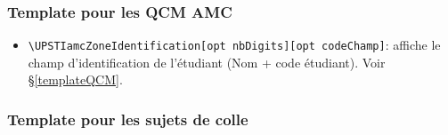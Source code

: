 \documentclass[11pt]{article}
\begin{document}
\subsubsection{Template pour les QCM AMC}
\begin{figure}[!ht]
    \centering
\end{figure}

\begin{figure}[!ht]
    \centering
\end{figure}

\begin{itemize}
\item \color{UPSTIcustomColor1}\verb!\UPSTIamcZoneIdentification[opt nbDigits][opt codeChamp]!\color{black}: affiche le champ d'identification de l'étudiant (Nom + code étudiant). Voir \S \ref{templateQCM}.
\end{itemize}

\subsubsection{Template pour les sujets de colle\label{templateKhollebasic}}
\begin{figure}[!ht]
    \centering
\end{figure}

\begin{figure}[!ht]
    \centering
\end{figure}
\end{document}
